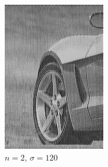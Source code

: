 \documentclass[
	12pt, %
]{style/fphw}
\begin{document}
\begin{figure}[H]
\begin{subfigure}[b]{.22\textwidth}
             \includegraphics[width=\textwidth]{plots2/Q5_3_2_120.png}
             \caption{$n=2$, $\sigma=120$}
             \label{Q5_3_2_120}
         \end{subfigure}
     \vfill
         \begin{subfigure}[b]{.22\textwidth}
             \centering

\end{subfigure}
\end{figure}
\end{document}
